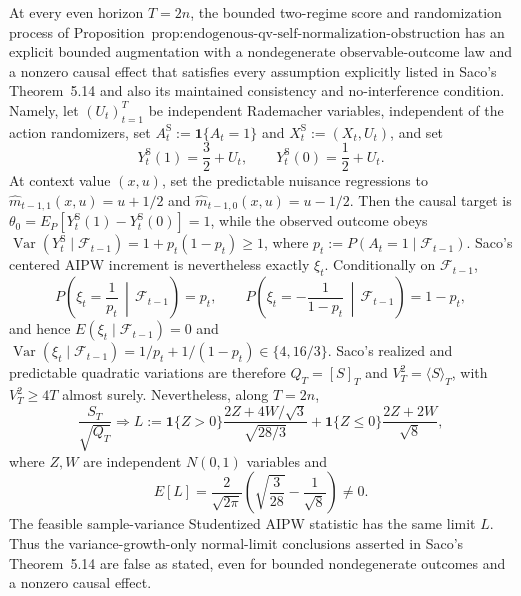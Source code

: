 At every even horizon \(T=2n\), the bounded two-regime score and randomization process of Proposition~\(\text{prop:endogenous-qv-self-normalization-obstruction}\) has an explicit bounded augmentation with a nondegenerate observable-outcome law and a nonzero causal effect that satisfies every assumption explicitly listed in Saco's Theorem~5.14 and also its maintained consistency and no-interference condition. Namely, let \((U_t)_{t=1}^T\) be independent Rademacher variables, independent of the action randomizers, set \(A_t^{\mathrm S}:=\mathbf1\{A_t=1\}\) and \(X_t^{\mathrm S}:=(X_t,U_t)\), and set
\[
 Y_t^{\mathrm S}(1)=\frac32+U_t,
 \qquad
 Y_t^{\mathrm S}(0)=\frac12+U_t.
\]
At context value \((x,u)\), set the predictable nuisance regressions to \(\widehat m_{t-1,1}(x,u)=u+1/2\) and \(\widehat m_{t-1,0}(x,u)=u-1/2\). Then the causal target is \(\theta_0=E_P[Y_t^{\mathrm S}(1)-Y_t^{\mathrm S}(0)]=1\), while the observed outcome obeys \(\operatorname{Var}(Y_t^{\mathrm S}\mid\mathcal F_{t-1})=1+p_t(1-p_t)\ge1\), where \(p_t:=P(A_t=1\mid\mathcal F_{t-1})\). Saco's centered AIPW increment is nevertheless exactly \(\xi_t\). Conditionally on \(\mathcal F_{t-1}\),
\[
 P\!\left(\xi_t=\frac1{p_t}\,\middle|\,\mathcal F_{t-1}\right)=p_t,
 \qquad
 P\!\left(\xi_t=-\frac1{1-p_t}\,\middle|\,\mathcal F_{t-1}\right)=1-p_t,
\]
and hence \(E(\xi_t\mid\mathcal F_{t-1})=0\) and \(\operatorname{Var}(\xi_t\mid\mathcal F_{t-1})=1/p_t+1/(1-p_t)\in\{4,16/3\}\). Saco's realized and predictable quadratic variations are therefore \(Q_T=[S]_T\) and \(V_T^2=\langle S\rangle_T\), with \(V_T^2\ge4T\) almost surely. Nevertheless, along \(T=2n\),
\[
 \frac{S_T}{\sqrt{Q_T}}\Longrightarrow
 L:=\mathbf1\{Z>0\}\frac{2Z+4W/\sqrt3}{\sqrt{28/3}}
 +\mathbf1\{Z\le0\}\frac{2Z+2W}{\sqrt8},
\]
where \(Z,W\) are independent \(N(0,1)\) variables and
\[
 E[L]=\frac{2}{\sqrt{2\pi}}
 \left(\sqrt{\frac3{28}}-\frac1{\sqrt8}\right)\ne0.
\]
The feasible sample-variance Studentized AIPW statistic has the same limit \(L\). Thus the variance-growth-only normal-limit conclusions asserted in Saco's Theorem~5.14 are false as stated, even for bounded nondegenerate outcomes and a nonzero causal effect.
